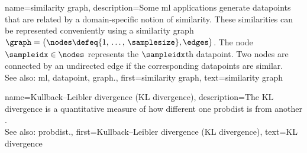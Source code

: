  {name={similarity graph}, 
 	description={Some \gls{ml} applications generate \glspl{datapoint} that 
 		are related by a domain-specific notion of similarity. These similarities can be 
 		represented conveniently using a similarity \gls{graph} $\graph = \big(\nodes \defeq \{1, \,\ldots, \,\samplesize\}, \edges\big)$. 
 		The node $\sampleidx \in \nodes$ represents the $\sampleidx$th \gls{datapoint}. Two 
 		nodes are connected by an undirected edge if the corresponding \glspl{datapoint} are similar. 
				\\
		See also: \gls{ml}, \gls{datapoint}, \gls{graph}.},
 	first={similarity graph},
	text={similarity graph} 
}
 
 
 {name={Kullback–Leibler divergence (KL divergence)}, 
 	description={The KL divergence is a quantitative 
 		 measure of how different one \gls{probdist} is from another \cite{coverthomas}.  
		 		\\
		See also: \gls{probdist}.},
 	first={Kullback–Leibler divergence (KL divergence)},
	text={KL divergence} 
}

